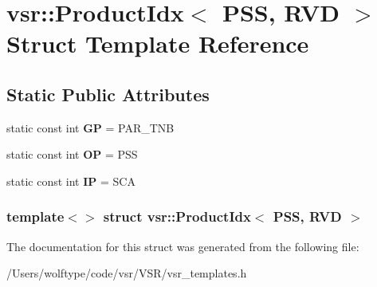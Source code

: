 \hypertarget{structvsr_1_1_product_idx_3_01_p_s_s_00_01_r_v_d_01_4}{\section{vsr\-:\-:Product\-Idx$<$ P\-S\-S, R\-V\-D $>$ Struct Template Reference}
\label{structvsr_1_1_product_idx_3_01_p_s_s_00_01_r_v_d_01_4}
}
\subsection*{Static Public Attributes}
\begin{DoxyCompactItemize}
\item 
\hypertarget{structvsr_1_1_product_idx_3_01_p_s_s_00_01_r_v_d_01_4_a1925b85acbecd56d37829f8e0c087df1}{static const int {\bfseries G\-P} = P\-A\-R\-\_\-\-T\-N\-B}\label{structvsr_1_1_product_idx_3_01_p_s_s_00_01_r_v_d_01_4_a1925b85acbecd56d37829f8e0c087df1}

\item 
\hypertarget{structvsr_1_1_product_idx_3_01_p_s_s_00_01_r_v_d_01_4_aceed2fb193d4894d7cd5af415f5016d2}{static const int {\bfseries O\-P} = P\-S\-S}\label{structvsr_1_1_product_idx_3_01_p_s_s_00_01_r_v_d_01_4_aceed2fb193d4894d7cd5af415f5016d2}

\item 
\hypertarget{structvsr_1_1_product_idx_3_01_p_s_s_00_01_r_v_d_01_4_acb390211e3aaa02e147a031d882ed0fd}{static const int {\bfseries I\-P} = S\-C\-A}\label{structvsr_1_1_product_idx_3_01_p_s_s_00_01_r_v_d_01_4_acb390211e3aaa02e147a031d882ed0fd}

\end{DoxyCompactItemize}
\subsubsection*{template$<$$>$ struct vsr\-::\-Product\-Idx$<$ P\-S\-S, R\-V\-D $>$}



The documentation for this struct was generated from the following file\-:\begin{DoxyCompactItemize}
\item 
/\-Users/wolftype/code/vsr/\-V\-S\-R/vsr\-\_\-templates.\-h\end{DoxyCompactItemize}
